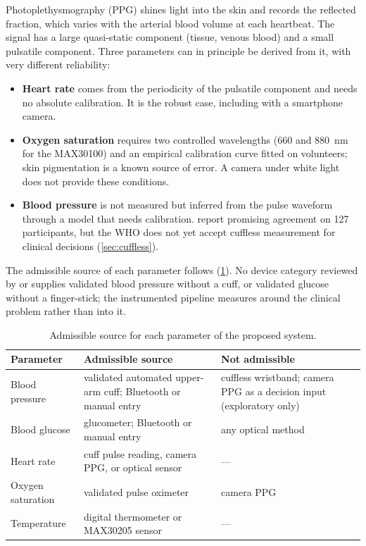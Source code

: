 Photoplethysmography (PPG) shines light into the skin and records the reflected fraction, which varies with the arterial blood volume at each heartbeat. The signal has a large quasi-static component (tissue, venous blood) and a small pulsatile component. Three parameters can in principle be derived from it, with very different reliability:
\begin{itemize}[nosep]
  \item \textbf{Heart rate} comes from the periodicity of the pulsatile component and needs no absolute calibration. It is the robust case, including with a smartphone camera.
  \item \textbf{Oxygen saturation} requires two controlled wavelengths (660 and 880~nm for the MAX30100) and an empirical calibration curve fitted on volunteers; skin pigmentation is a known source of error. A camera under white light does not provide these conditions.
  \item \textbf{Blood pressure} is not measured but inferred from the pulse waveform through a model that needs calibration. \Textcite{liu2025ppg} report promising agreement on 127 participants, but the WHO does not yet accept cuffless measurement for clinical decisions (\cref{sec:cuffless}).
\end{itemize}

The admissible source of each parameter follows (\cref{tab:param-sources}). No device category reviewed by \textcite{liu2025review} or \textcite{alhaddad2022} supplies validated blood pressure without a cuff, or validated glucose without a finger-stick; the instrumented pipeline measures around the clinical problem rather than into it.

\begin{table}[htbp]
\centering\small
\caption{Admissible source for each parameter of the proposed system.}\label{tab:param-sources}
\begin{tabularx}{\textwidth}{@{}>{\raggedright\arraybackslash}p{3.2cm} >{\raggedright\arraybackslash}X >{\raggedright\arraybackslash}p{4.6cm}@{}}
\toprule
\textbf{Parameter} & \textbf{Admissible source} & \textbf{Not admissible} \\
\midrule
Blood pressure & validated automated upper-arm cuff; Bluetooth or manual entry & cuffless wristband; camera PPG as a decision input (exploratory only) \\
Blood glucose & glucometer; Bluetooth or manual entry & any optical method \\
Heart rate & cuff pulse reading, camera PPG, or optical sensor & --- \\
Oxygen saturation & validated pulse oximeter & camera PPG \\
Temperature & digital thermometer or MAX30205 sensor & --- \\
\bottomrule
\end{tabularx}
\end{table}

